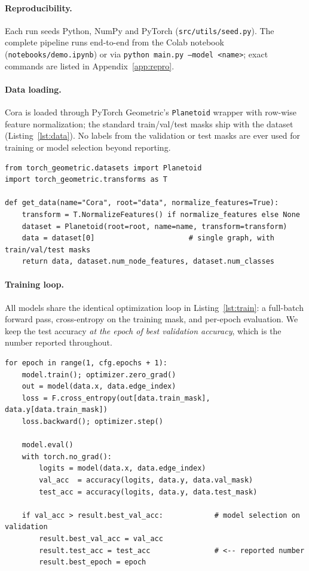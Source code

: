 \documentclass{article}
\begin{document}
\paragraph{Reproducibility.} Each run seeds Python, NumPy and PyTorch
(\texttt{src/utils/seed.py}). The complete pipeline runs end-to-end from the Colab
notebook (\texttt{notebooks/demo.ipynb}) or via \texttt{python main.py --model <name>};
exact commands are listed in Appendix~\ref{app:repro}.

\paragraph{Data loading.} Cora is loaded through PyTorch Geometric's \texttt{Planetoid}
wrapper with row-wise feature normalization; the standard train/val/test masks ship
with the dataset (Listing~\ref{lst:data}). No labels from the validation or test masks
are ever used for training or model selection beyond reporting.

\begin{lstlisting}[caption={Dataset loading with the standard split (\texttt{src/data\_loader/data\_loader.py}).},label={lst:data}]
from torch_geometric.datasets import Planetoid
import torch_geometric.transforms as T

def get_data(name="Cora", root="data", normalize_features=True):
    transform = T.NormalizeFeatures() if normalize_features else None
    dataset = Planetoid(root=root, name=name, transform=transform)
    data = dataset[0]                      # single graph, with train/val/test masks
    return data, dataset.num_node_features, dataset.num_classes
\end{lstlisting}

\paragraph{Training loop.} All models share the identical optimization loop in
Listing~\ref{lst:train}: a full-batch forward pass, cross-entropy on the training
mask, and per-epoch evaluation. We keep the test accuracy \emph{at the epoch of best
validation accuracy}, which is the number reported throughout.

\begin{lstlisting}[caption={Shared training / model-selection loop (\texttt{src/training/trainer.py}).},label={lst:train}]
for epoch in range(1, cfg.epochs + 1):
    model.train(); optimizer.zero_grad()
    out = model(data.x, data.edge_index)
    loss = F.cross_entropy(out[data.train_mask], data.y[data.train_mask])
    loss.backward(); optimizer.step()

    model.eval()
    with torch.no_grad():
        logits = model(data.x, data.edge_index)
        val_acc  = accuracy(logits, data.y, data.val_mask)
        test_acc = accuracy(logits, data.y, data.test_mask)

    if val_acc > result.best_val_acc:            # model selection on validation
        result.best_val_acc = val_acc
        result.test_acc = test_acc               # <-- reported number
        result.best_epoch = epoch
\end{lstlisting}
\end{document}

